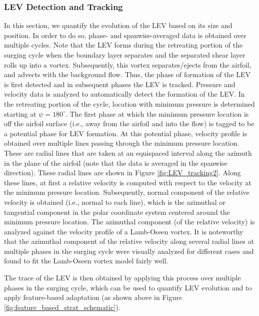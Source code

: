 \subsubsection{LEV Detection and Tracking}


In this section, we quantify the evolution of the LEV based on its size and position.
In order to do so, phase- and spanwise-averaged data is obtained over multiple cycles.
Note that the LEV forms during the retreating portion of the surging cycle when the boundary layer separates and the separated shear layer rolls up into a vortex. Subsequently, this vortex separates/ejects from the airfoil, and advects with the background flow.
Thus, the phase of formation of the LEV is first detected and in subsequent phases the LEV is tracked.
Pressure and velocity data is analyzed to automatically detect the formation of the LEV.
In the retreating portion of the cycle, location with minimum pressure is determined starting at $\psi=180^\circ$.
The first phase at which the minimum pressure location is off the airfoil surface (i.e., away from the airfoil and into the flow) is tagged to be a potential phase for LEV formation.
At this potential phase, velocity profile is obtained over multiple lines passing through the minimum pressure location.
These are radial lines that are taken at an equispaced interval along the azimuth in the plane of the airfoil (note that the data is averaged in the spanwise direction).
These radial lines are shown in Figure \ref{fig:LEV_tracking2}.
Along these lines, at first a relative velocity is computed with respect to the velocity at the minimum pressure location.
Subsequently, normal component of the relative velocity is obtained (i.e., normal to each line), which is the azimuthal or tangential component in the polar coordinate system centered around the minimum pressure location.
The azimuthal component (of the relative velocity) is analyzed against the velocity profile of a Lamb-Oseen vortex.
It is noteworthy that the azimuthal component of the relative velocity along several radial lines at multiple phases in the surging cycle were visually analyzed for different cases and found to fit the Lamb-Oseen vortex model fairly well.

The trace of the LEV is then obtained by applying this process over multiple phases in the surging cycle, which can be used to quantify LEV evolution and to apply feature-based adaptation (as shown above in Figure \ref{fig:feature_based_strat_schematic}).

